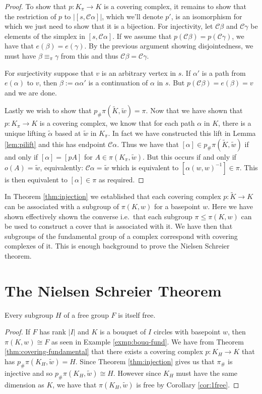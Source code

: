 \begin{proof}
  To show that $p:K_{\pi}\rightarrow K$ is a covering complex, it remains to show that the restriction of $p$ to $|[s,\mathcal{C}\alpha]|$, which we'll denote $p'$, is an isomorphism for which we just need to show that it is a bijection. For injectivity, let $\mathcal{C}\beta$ and $\mathcal{C}\gamma$ be elements of the simplex in $[s,\mathcal{C}\alpha]$. If we assume that $p(\mathcal{C}\beta) = p(\mathcal{C}\gamma)$, we have that $e(\beta) = e(\gamma)$. By the previous argument showing disjointedness, we must have $\beta \equiv_\pi \gamma$ from this and thus $\mathcal{C}\beta = \mathcal{C}\gamma$.

  For surjectivity suppose that $v$ is an arbitrary vertex in $s$. If $\alpha'$ is a path from $e(\alpha)$ to $v$, then $\beta := \alpha\alpha'$ is a continuation of $\alpha$ in $s$. But $p(\mathcal{C}\beta) = e(\beta) = v$ and we are done.

  Lastly we wish to show that $p_{\#}\pi(\tilde{K},\tilde{w}) = \pi$. Now that we have shown that $p:K_{\pi}\rightarrow K$ is a covering complex, we know that for each path $\alpha$ in $K$, there is a unique lifting $\tilde{\alpha}$ based at $\tilde{w}$ in $K_{\pi}$. In fact we have constructed this lift in Lemma \ref{lem:pilift} and this has endpoint $\mathcal{C}\alpha$. Thus we have that $[\alpha] \in p_{\#}\pi(\tilde{K},\tilde{w})$ if and only if $[\alpha] = [pA]$ for $A \in \pi(K_\pi,\tilde{w})$. But this occurs if and only if $o(A) = \tilde{w}$, equivalently: $\mathcal{C}\alpha = \tilde{w}$ which is equivalent to $[\alpha(w,w)^{-1}] \in \pi$. This is then equivalent to $[\alpha] \in \pi$ as required.
\end{proof}

In Theorem \ref{thm:injection} we established that each covering complex $p:\tilde{K} \rightarrow K$ can be associated with a subgroup of $\pi(K,w)$ for a basepoint $w$. Here we have shown effectively shown the converse i.e.\ that each subgroup $\pi \leq \pi(K,w)$ can be used to construct a cover that is associated with it. We have then that subgroups of the fundamental group of a complex correspond with covering complexes of it. This is enough background to prove the Nielsen Schreier theorem.

\section{The Nielsen Schreier Theorem}
\begin{theorem}\label{thm:ns}
  Every subgroup $H$ of a free group $F$ is itself free.
\end{theorem}
\begin{proof}
  If $F$ has rank $|I|$ and $K$ is a bouquet of $I$ circles with basepoint $w$, then $\pi(K,w) \cong F$ as seen in Example \ref{exmp:bouq-fund}. We have from Theorem \ref{thm:covering-fundamental} that there exists a covering complex $p:K_H \rightarrow K$ that has $p_{\#}\pi(K_H,\tilde{w}) = H$. Since Theorem \ref{thm:injection} gives us that $\pi_{\#}$ is injective and so $p_{\#}\pi(K_H,\tilde{w}) \cong H$. However since $K_H$ must have the same dimension as $K$, we have that $\pi(K_H,\tilde{w})$ is free by Corollary \ref{cor:1free}.
\end{proof}
